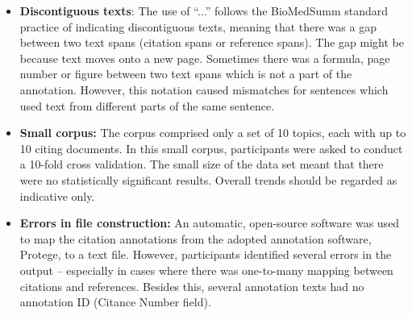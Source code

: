 \documentclass[11pt]{article}
\begin{document}
\begin{itemize}
\vspace{-.3cm}
\item \textbf{Discontiguous texts}: The use of ``...''  follows the BioMedSumm standard practice of indicating discontiguous texts, meaning that there was a gap between two text spans (citation spans or reference spans). The gap might be because text moves onto a new page. Sometimes there was a formula, page number or figure between two text spans which is not a part of the annotation. However, this notation caused mismatches for sentences which used text from different parts of the same sentence.
\vspace{-.3cm}
\item \textbf{Small corpus:} The corpus comprised only a set of 10 topics, each with up to 10 citing documents. In this small
  corpus, participants were asked to conduct a 10-fold cross validation. The small size of the data set meant that there were no
  statistically significant results.  Overall trends should be regarded as indicative only.
\vspace{-.3cm}
\item \textbf{Errors in file construction:} An automatic, open-source software was used to map the citation annotations from the adopted annotation software, Protege, to a text file.  However, participants identified several errors in the output -- especially in cases where there was one-to-many mapping between citations and references.  Besides this, several annotation texts had no annotation ID (Citance Number field).
\end{itemize}

%
\end{document}
